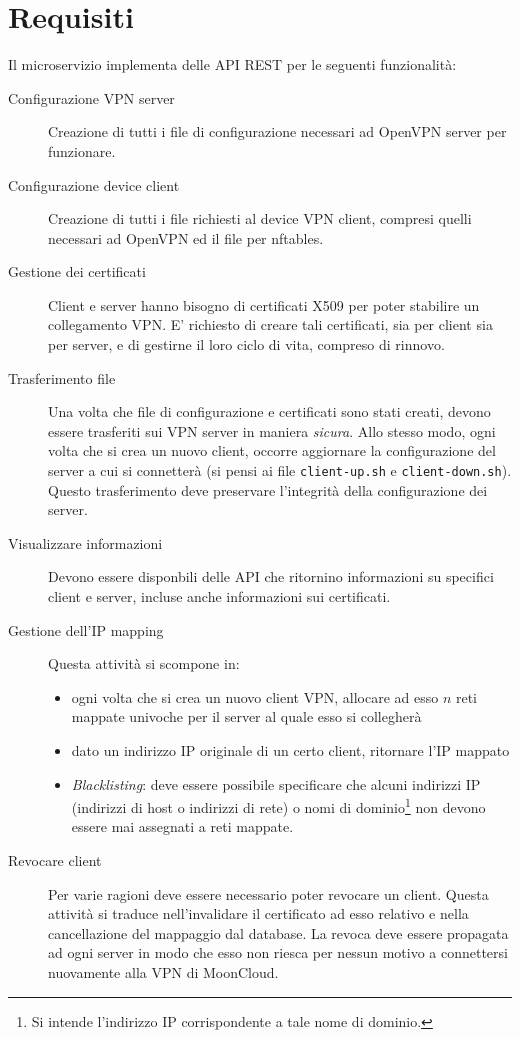 \section{Requisiti}
Il microservizio implementa delle API REST per le seguenti funzionalità:
\begin{description}
  \item[Configurazione VPN server]Creazione di tutti i file di configurazione
  necessari ad OpenVPN server per funzionare.
  \item[Configurazione device client]Creazione di tutti i file richiesti al
  device VPN client, compresi quelli necessari ad OpenVPN ed il file per nftables.
  \item[Gestione dei certificati]Client e server hanno bisogno di certificati
  X509 per poter stabilire un collegamento VPN. E' richiesto di creare tali
  certificati, sia per client sia per server, e di gestirne il loro ciclo di vita,
  compreso di rinnovo.
  \item[Trasferimento file]Una volta che file di configurazione e certificati
  sono stati creati, devono essere trasferiti sui VPN server in maniera \textit{sicura}.
  Allo stesso modo, ogni volta che si crea un nuovo client, occorre aggiornare
  la configurazione del server a cui si connetterà (si pensi ai file \texttt{client-up.sh}
  e \texttt{client-down.sh}). Questo trasferimento deve preservare l'integrità
  della configurazione dei server.
  \item[Visualizzare informazioni]Devono essere disponbili delle API che ritornino informazioni
  su specifici client e server, incluse anche informazioni sui certificati.
  \item[Gestione dell'IP mapping]Questa attività si scompone in:
  \begin{itemize}
    \item ogni volta che si crea un nuovo client VPN, allocare ad esso $n$ reti mappate
    univoche per il server al quale esso si collegherà
    \item dato un indirizzo IP originale di un certo client, ritornare l'IP mappato
    \item \textit{Blacklisting}: deve essere possibile specificare che alcuni indirizzi
    IP (indirizzi di host o indirizzi di rete) o nomi di dominio\footnote{Si intende
    l'indirizzo IP corrispondente a tale nome di dominio.} non devono essere mai assegnati
    a reti mappate.
  \end{itemize}
  \item[Revocare client]Per varie ragioni deve essere necessario poter revocare un
  client. Questa attività si traduce nell'invalidare il certificato ad esso relativo
  e nella cancellazione del mappaggio dal database.
  La revoca deve essere propagata ad ogni server in modo che esso non riesca per nessun
  motivo a connettersi nuovamente alla VPN di MoonCloud.
\end{description}


